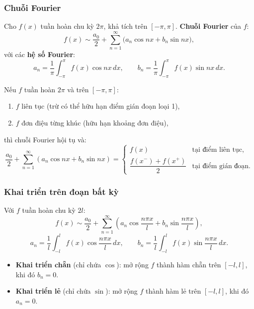 \documentclass[12pt,a4paper]{article}
\begin{document}
\subsubsection{Chuỗi Fourier}

\begin{dinhnghia}
  Cho $f(x)$ tuần hoàn chu kỳ $2\pi$, khả tích trên $[-\pi, \pi]$. \textbf{Chuỗi Fourier} của $f$:
  \[
    f(x) \sim \frac{a_0}{2} + \sum_{n=1}^{\infty} \bigl(a_n \cos nx + b_n \sin nx\bigr),
  \]
  với các \textbf{hệ số Fourier}:
  \[
    a_n = \frac{1}{\pi}\int_{-\pi}^{\pi} f(x)\cos nx\,dx, \qquad b_n = \frac{1}{\pi}\int_{-\pi}^{\pi} f(x)\sin nx\,dx.
  \]
\end{dinhnghia}

\begin{dinhly}[title={Điều kiện Dirichlet (điều kiện đủ hội tụ)}]
  Nếu $f$ tuần hoàn $2\pi$ và trên $[-\pi, \pi]$:
  \begin{enumerate}
    \item $f$ liên tục (trừ có thể hữu hạn điểm gián đoạn loại 1),
    \item $f$ đơn điệu từng khúc (hữu hạn khoảng đơn điệu),
  \end{enumerate}
  thì chuỗi Fourier hội tụ và:
  \[
    \frac{a_0}{2} + \sum_{n=1}^{\infty} (a_n \cos nx + b_n \sin nx) = \begin{cases} f(x) & \text{tại điểm liên tục,} \\[4pt] \dfrac{f(x^-) + f(x^+)}{2} & \text{tại điểm gián đoạn.} \end{cases}
  \]
\end{dinhly}

\subsubsection{Khai triển trên đoạn bất kỳ}

\begin{congthuc}[title={Chuỗi Fourier trên $[-l,\, l]$}]
  Với $f$ tuần hoàn chu kỳ $2l$:
  \[
    f(x) \sim \frac{a_0}{2} + \sum_{n=1}^{\infty} \left(a_n \cos\frac{n\pi x}{l} + b_n \sin\frac{n\pi x}{l}\right),
  \]
  \[
    a_n = \frac{1}{l}\int_{-l}^{l} f(x)\cos\frac{n\pi x}{l}\,dx, \qquad b_n = \frac{1}{l}\int_{-l}^{l} f(x)\sin\frac{n\pi x}{l}\,dx.
  \]
\end{congthuc}

\begin{phuongphap}[title={Khai triển hàm trên $[0, l]$}]
  \begin{itemize}
    \item \textbf{Khai triển chẵn} (chỉ chứa $\cos$): mở rộng $f$ thành hàm chẵn trên $[-l, l]$, khi đó $b_n = 0$.
    \item \textbf{Khai triển lẻ} (chỉ chứa $\sin$): mở rộng $f$ thành hàm lẻ trên $[-l, l]$, khi đó $a_n = 0$.
  \end{itemize}
\end{phuongphap}
\end{document}

